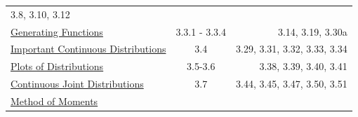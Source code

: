 \documentclass[]{book}
\theoremstyle{definition}
\theoremstyle{definition}
\theoremstyle{definition}
\theoremstyle{remark}
\begin{document}
\begin{longtable}[]{@{}lcr@{}}
\begin{minipage}[t]{0.29\columnwidth}
3.8, 3.10, 3.12\strut
\end{minipage}\tabularnewline
\begin{minipage}[t]{0.29\columnwidth}\raggedright\strut
\protect\hyperlink{L14}{Generating Functions}\strut
\end{minipage} & \begin{minipage}[t]{0.33\columnwidth}\centering\strut
3.3.1 - 3.3.4\strut
\end{minipage} & \begin{minipage}[t]{0.29\columnwidth}\raggedleft\strut
3.14, 3.19, 3.30a\strut
\end{minipage}\tabularnewline
\begin{minipage}[t]{0.29\columnwidth}\raggedright\strut
\protect\hyperlink{L15}{Important Continuous Distributions}\strut
\end{minipage} & \begin{minipage}[t]{0.33\columnwidth}\centering\strut
3.4\strut
\end{minipage} & \begin{minipage}[t]{0.29\columnwidth}\raggedleft\strut
3.29, 3.31, 3.32, 3.33, 3.34\strut
\end{minipage}\tabularnewline
\begin{minipage}[t]{0.29\columnwidth}\raggedright\strut
\protect\hyperlink{L16}{Plots of Distributions}\strut
\end{minipage} & \begin{minipage}[t]{0.33\columnwidth}\centering\strut
3.5-3.6\strut
\end{minipage} & \begin{minipage}[t]{0.29\columnwidth}\raggedleft\strut
3.38, 3.39, 3.40, 3.41\strut
\end{minipage}\tabularnewline
\begin{minipage}[t]{0.29\columnwidth}\raggedright\strut
\protect\hyperlink{L17}{Continuous Joint Distributions}\strut
\end{minipage} & \begin{minipage}[t]{0.33\columnwidth}\centering\strut
3.7\strut
\end{minipage} & \begin{minipage}[t]{0.29\columnwidth}\raggedleft\strut
3.44, 3.45, 3.47, 3.50, 3.51\strut
\end{minipage}\tabularnewline
\begin{minipage}[t]{0.29\columnwidth}\raggedright\strut
\protect\hyperlink{L18}{Method of Moments}\strut
\end{minipage} & \begin{minipage}[t]{0.33\columnwidth}\centering\strut

\end{minipage}
\end{longtable}
\end{document}
